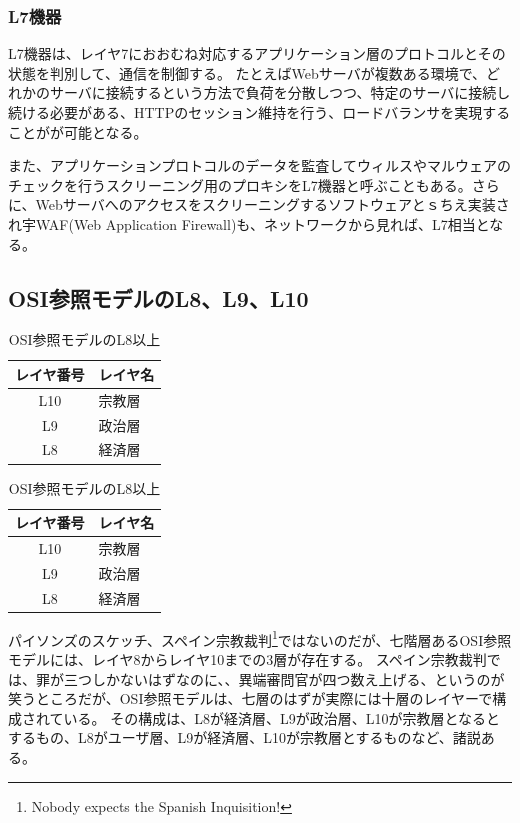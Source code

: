 \subsubsection{L7機器}

L7機器は、レイヤ7におおむね対応するアプリケーション層のプロトコルとその状態を判別して、通信を制御する。
たとえばWebサーバが複数ある環境で、どれかのサーバに接続するという方法で負荷を分散しつつ、特定のサーバに接続し続ける必要がある、HTTPのセッション維持を行う、ロードバランサを実現することがが可能となる。

また、アプリケーションプロトコルのデータを監査してウィルスやマルウェアのチェックを行うスクリーニング用のプロキシをL7機器と呼ぶこともある。さらに、Webサーバへのアクセスをスクリーニングするソフトウェアとｓちえ実装され宇WAF(Web Application Firewall)も、ネットワークから見れば、L7相当となる。

\subsection{OSI参照モデルのL8、L9、L10}

\begin{table}[hbtp] 
\begin{center} \label{osirm}
	\begin{tabular}{cl} \toprule 
		レイヤ番号 & レイヤ名 \\ \midrule
		L10 & 宗教層 \\
		L9 & 政治層 \\
		L8 & 経済層 \\ \bottomrule
	\end{tabular}
\end{center} \caption{OSI参照モデルのL8以上}
\end{table}\begin{table}[hbtp] 
\begin{center} \label{osirm}
	\begin{tabular}{cl} \toprule 
		レイヤ番号 & レイヤ名 \\ \midrule
		L10 & 宗教層 \\
		L9 & 政治層 \\
		L8 & 経済層 \\ \bottomrule
	\end{tabular}
\end{center} \caption{OSI参照モデルのL8以上}
\end{table}

パイソンズのスケッチ、スペイン宗教裁判\footnote{Nobody expects the Spanish Inquisition!}ではないのだが、七階層あるOSI参照モデルには、レイヤ8からレイヤ10までの3層が存在する。
スペイン宗教裁判では、罪が三つしかないはずなのに、、異端審問官が四つ数え上げる、というのが笑うところだが、OSI参照モデルは、七層のはずが実際には十層のレイヤーで構成されている。
その構成は、L8が経済層、L9が政治層、L10が宗教層となるとするもの、L8がユーザ層、L9が経済層、L10が宗教層とするものなど、諸説ある。

